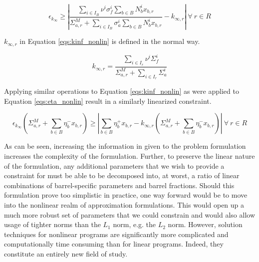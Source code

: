 \begin{equation}
\label{eqs:kinf_nonlin}
\epsilon_{k_{\infty}} \geq \left| 
\frac{\sum_{i \in I_{B}} \nu^{i} \sigma_{f}^{i} \sum_{b \in B} N_{b}^{i} x_{b,r}}
     {\Sigma_{a,r}^{M} + \sum_{i \in I_{B}} \sigma_{a}^{i} \sum_{b \in B} N_{b}^{i} x_{b,r}} 
- k_{\infty,r} \right|
\: \forall \: r \in R
\end{equation}

$k_{\infty,r}$ in Equation \ref{eqs:kinf_nonlin} is defined in the normal way.

\begin{equation}
\label{eqs:kinf_r}
k_{\infty,r} = \frac{\sum_{i \in I_{r}} \nu^{i} \Sigma_{f}^{i}}
                    {\Sigma_{a,r}^{M} + \sum_{i \in I_{r}} \Sigma_{a}^{i}}
\end{equation}

Applying similar operations to Equation \ref{eqs:kinf_nonlin} as were applied to
Equation \ref{eqs:eta_nonlin} result in a similarly linearized constraint.

\begin{equation}
\label{eqs:kinf_linear}
\epsilon_{k_{\infty}} \left( \Sigma_{a,r}^{M} + \sum_{b \in B} \eta_{b}^{-} x_{b,r} \right)
\geq
\left| \sum_{b \in B} \eta_{b}^{+} x_{b,r}
- k_{\infty,r}  \left( \Sigma_{a,r}^{M} + \sum_{b \in B} \eta_{b}^{-} x_{b,r} \right) \right|
\: \forall \: r \in R
\end{equation}

As can be seen, increasing the information in given to the problem formulation
increases the complexity of the formulation. Further, to preserve the linear
nature of the formulation, any additional parameters that we wish to provide a
constraint for must be able to be decomposed into, at worst, a ratio of linear
combinations of barrel-specific parameters and barrel fractions. Should this
formulation prove too simplistic in practice, one way forward would be to move
into the nonlinear realm of approximation formulations. This would open up a
much more robust set of parameters that we could constrain and would also allow
usage of tighter norms than the $L_1$ norm, e.g. the $L_2$ norm. However,
solution techniques for nonlinear programs are significantly more complicated
and computationally time consuming than for linear programs. Indeed, they
constitute an entirely new field of study.
